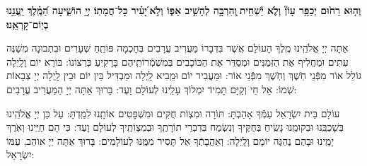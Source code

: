 \documentclass[twoside, openany, parskip=half, 11pt]{book}
\begin{document}
\halfkaddish
 

\textbf{וְה֤וּא רַח֙וּם
 יְכַפֵּ֥ר עָוֹן֘ וְלֹ֢א יַ֫שְׁחִ֥ית ֖וְהִרְבָּ֣ה לְהָשִׁ֣יב אַפּ֑וֹ וְלֹ֣א ֝יָעִ֗יר כָּל־חֲמָתֽוֹ׃ יְיָ֥
  הוֹשִׁ֑יעָה הַ֝מֶּֽ֗לֶךְ יַֽעֲנֵ֥נוּ בְיֽוֹם־קָרְאֵֽנוּ׃}


\barachu

\newcommand{\hamaarivaravim}{
\firstword{בָּרוּךְ}
 אַתָּה יְיָ אֱלֹהֵֽינוּ מֶֽלֶךְ הָעוֹלָם אֲשֶׁר בִּדְבָרוֹ מַעֲרִיב עֲרָבִים בְּחָכְמָה פּוֹתֵֽחַ שְׁעָרִים וּבִתְבוּנָה מְשַׁנֶּה עִתִּים וּמַחֲלִיף אֶת הַזְּמַנִּים וּמְסַדֵּר אֶת הַכּוֹכָבִים בְּמִשְׁמְֿרוֹתֵֽיהֶם בָּרָקִֽיעַ כְּרְצוֹנוֹ: בּוֹרֵא יוֹם וָלָֽיְלָה גּוֹלֵל אוֹר מִפְּֿנֵי חֹֽשֶׁךְ וְחֹֽשֶׁךְ מִפְּֿנֵי אוֹר: וּמַעֲבִיר יוֹם וּמֵֽבִיא לָֽיְלָה וּמַבְדִּיל בֵּין יוֹם וּבֵין לָֽיְלָה יְיָ צְבָאוֹת שְׁמוֹ:
 \adforn{14}
  אֵל חַי וְקַיָּם תָּמִיד יִמְלוֹךְ עָלֵֽינוּ לְעוֹלָם וָעֶד: בָּרוּךְ אַתָּה יְיָ הַמַּעֲרִיב עֲרָבִים: 
}

\newcommand{\ahavasolam}{
\firstword{אַהֲבַת}
 עוֹלָם בֵּית יִשְׂרָאֵל עַמְּֿךָ אָהַבְתָּ: תּוֹרָה וּמִצְוֹת חֻקִּים וּמִשְׁפָּטִים אוֹתָֽנוּ לִמַֽדְתָּ: עַל כֵּן יְיָ אֱלֹהֵֽינוּ בְּשָׁכְבֵּֽנוּ וּבְקוּמֵֽנוּ נָשִֽׂיחַ בְּחֻקֶּיךָ וְנִשְׂמַח בְּדִבְרֵי תוֹרָתֶֽךָ וּבְמִצְוֹתֶֽיךָ לְעוֹלָם וָעֶד: כִּי הֵם חַיֵּֽינוּ וְאֹֽרֶךְ יָמֵֽינוּ וּבָהֶם נֶהְגֶּה יוֹמָם וָלָֽיְלָה:
 \adforn{14}
  וְאַהֲבָתְֿךָ אַל תָּסִיר מִמֶּֽנּוּ לְעוֹלָמִים: בָּרוּךְ אַתָּה יְיָ אוֹהֵב, עַמּוֹ יִשְׂרָאֵל:
}

\hamaarivaravim

\ahavasolam

\shema 

\veahavta 

\vehaya 

\vayomer 
\end{document}
